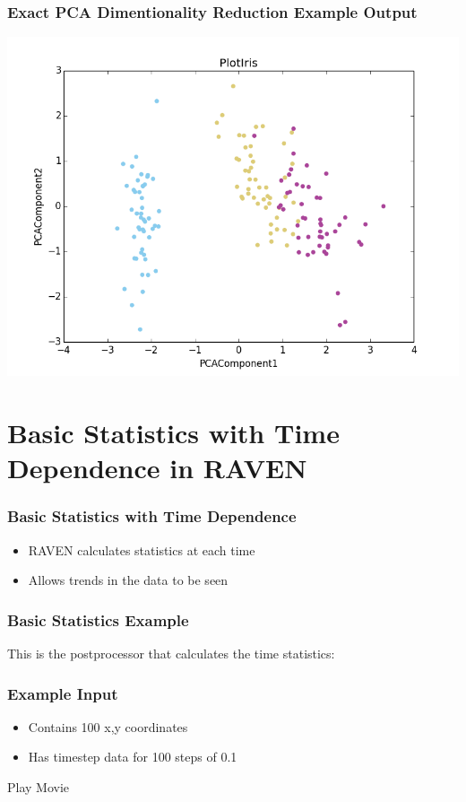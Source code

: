 \documentclass[t,9pt,svgnames]{beamer}
\begin{document}
\begin{frame}
  \frametitle{Exact PCA Dimentionality Reduction Example Output}
  \includegraphics[width=\textwidth]{images/PlotExactPCA.png}
\end{frame}

\section{Basic Statistics with Time Dependence in RAVEN}

\begin{frame}
  \frametitle{Basic Statistics with Time Dependence}
  \begin{itemize}
  \item RAVEN calculates statistics at each time
  \item Allows trends in the data to be seen
  \end{itemize}
\end{frame}

\begin{frame}[fragile]
  \frametitle{Basic Statistics Example}
  This is the postprocessor that calculates the time statistics:
  

\end{frame}

\begin{frame}
  \frametitle{Example Input}
  \begin{itemize}
  \item Contains 100 x,y coordinates
  \item Has timestep data for 100 steps of 0.1
  \end{itemize}
  Play Movie  
\end{frame}
\end{document}
